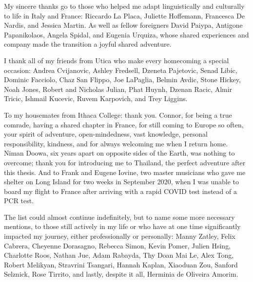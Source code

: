My sincere thanks go to those who helped me adapt linguistically and culturally to life in Italy and France: Riccardo La Placa, Juliette Hoffemann, Francesca De Nardis, and Jessica Martin. As well as fellow foreigners David Paiypa, Antigone Papanikolaos, Angela Spidal, and Eugenia Urquiza, whose shared experiences and company made the transition a joyful shared adventure.

I thank all of my friends from Utica who make every homecoming a special occasion: Andrea Cvijanovic, Ashley Fredsell, Dzeneta Pajetovic, Senad Libic, Dominic Facciolo, Chaz San Flippo, Joe LaPaglia, Belmin Avdic, Stone Hickey, Noah Jones, Robert and Nicholas Julian, Phat Huynh, Dzenan Racic, Almir Tricic, Ishmail Kucevic, Ruvem Karpovich, and Trey Liggins. 

To my housemates from Ithaca College: thank you. Connor, for being a true comrade, having a shared chapter in France, for still coming to Europe so often, your spirit of adventure, open-mindedness, vast knowledge, personal responsibility, kindness, and for always welcoming me when I return home. Niman Doowa, six years apart on opposite sides of the Earth, was nothing to overcome; thank you for introducing me to Thailand, the perfect adventure after this thesis. And to Frank and Eugene Iovine, two master musicians who gave me shelter on Long Island for two weeks in September 2020, when I was unable to board my flight to France after arriving with a rapid COVID test instead of a PCR test.

The list could almost continue indefinitely, but to name some more necessary mentions, to those still actively in my life or who have at one time significantly impacted my journey, either professionally or personally: Manny Zatley, Felix Cabrera, Cheyenne Dorasagno, Rebecca Simon, Kevin Pomer, Julien Hsing, Charlotte Roos, Nathan Jue, Adam Rabayda, Thy Doan Mai Le, Alex Tong, Robert Melikyan, Stravrini Tsangari, Hannah Kaplan, Xiaoduan Zou, Sanford Selznick, Rose Tirrito, and lastly, despite it all, Herminia de Oliveira Amorim. 
